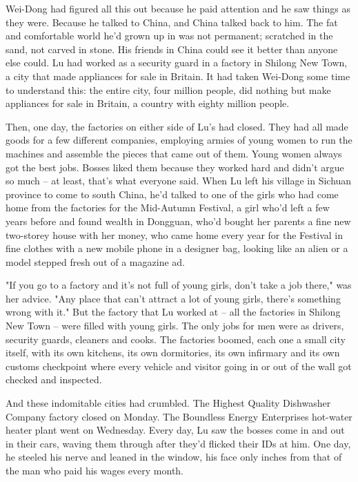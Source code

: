 Wei-Dong had figured all this out because he paid attention and he
saw things as they were. Because he talked to China, and China
talked back to him. The fat and comfortable world he'd grown up in
was not permanent; scratched in the sand, not carved in stone. His
friends in China could see it better than anyone else could. Lu had
worked as a security guard in a factory in Shilong New Town, a city
that made appliances for sale in Britain. It had taken Wei-Dong
some time to understand this: the entire city, four million people,
did nothing but make appliances for sale in Britain, a country with
eighty million people.

Then, one day, the factories on either side of Lu's had closed.
They had all made goods for a few different companies, employing
armies of young women to run the machines and assemble the pieces
that came out of them. Young women always got the best jobs. Bosses
liked them because they worked hard and didn't argue so much -- at
least, that's what everyone said. When Lu left his village in
Sichuan province to come to south China, he'd talked to one of the
girls who had come home from the factories for the Mid-Autumn
Festival, a girl who'd left a few years before and found wealth in
Dongguan, who'd bought her parents a fine new two-storey house with
her money, who came home every year for the Festival in fine
clothes with a new mobile phone in a designer bag, looking like an
alien or a model stepped fresh out of a magazine ad.

"If you go to a factory and it's not full of young girls, don't
take a job there," was her advice. "Any place that can't attract a
lot of young girls, there's something wrong with it." But the
factory that Lu worked at -- all the factories in Shilong New Town
-- were filled with young girls. The only jobs for men were as
drivers, security guards, cleaners and cooks. The factories boomed,
each one a small city itself, with its own kitchens, its own
dormitories, its own infirmary and its own customs checkpoint where
every vehicle and visitor going in or out of the wall got checked
and inspected.

And these indomitable cities had crumbled. The Highest Quality
Dishwasher Company factory closed on Monday. The Boundless Energy
Enterprises hot-water heater plant went on Wednesday. Every day, Lu
saw the bosses come in and out in their cars, waving them through
after they'd flicked their IDs at him. One day, he steeled his
nerve and leaned in the window, his face only inches from that of
the man who paid his wages every month.

